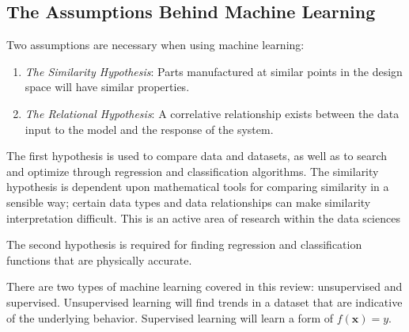 \subsection{The Assumptions Behind Machine Learning}
Two assumptions are necessary when using machine learning:
\begin{enumerate}
\item \textit{The Similarity Hypothesis}: Parts manufactured at similar points in the design space will have similar properties.
\item \textit{The Relational Hypothesis}: A correlative relationship exists between the data input to the model and the response of the system.
\end{enumerate}

The first hypothesis is used to compare data and datasets, as well as to search and optimize through regression and classification algorithms. The similarity hypothesis is dependent upon mathematical tools for comparing similarity in a sensible way; certain data types and data relationships can make similarity interpretation difficult. This is an active area of research within the data sciences

The second hypothesis is required for finding regression and classification functions that are physically accurate.

There are two types of machine learning covered in this review: unsupervised and supervised. Unsupervised learning will find trends in a dataset that are indicative of the underlying behavior. Supervised learning will learn a form of $f(\mathbf{x}) = y$. 



